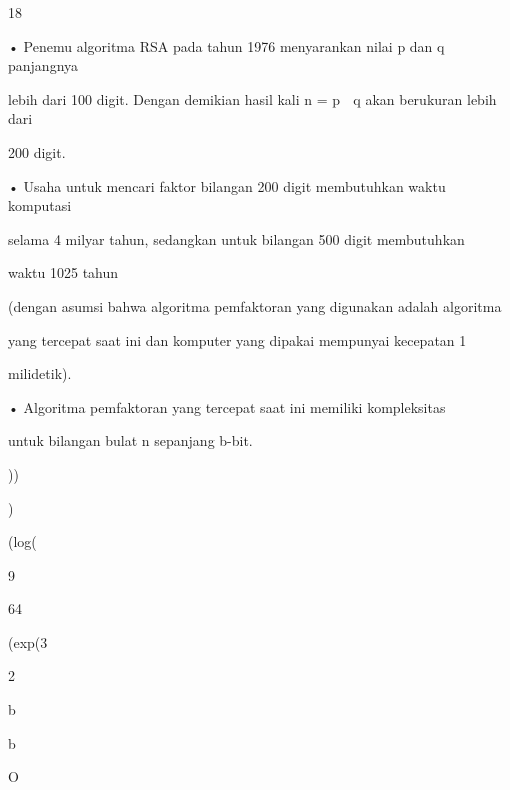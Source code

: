 \documentclass{article}
\begin{document}

18

• Penemu algoritma RSA pada tahun  1976 menyarankan nilai p dan q panjangnya 

lebih dari 100 digit. Dengan demikian hasil kali n = p  q akan berukuran lebih dari 

200 digit. 

• Usaha untuk mencari faktor bilangan 200 digit membutuhkan waktu komputasi 

selama 4 milyar tahun, sedangkan untuk bilangan 500 digit membutuhkan 

waktu 1025 tahun

   (dengan asumsi bahwa algoritma pemfaktoran yang digunakan adalah algoritma  

yang tercepat saat ini dan komputer yang dipakai mempunyai kecepatan 1 

milidetik).

• Algoritma pemfaktoran yang tercepat saat ini memiliki kompleksitas  



    untuk bilangan bulat n sepanjang b-bit.

))

)

(log(

9

64

(exp(3

2

b

b

O
\end{document}
